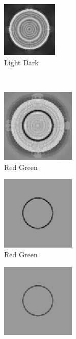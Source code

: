 \documentclass[journal,onecolumn]{IEEEtran}
\begin{document}
\begin{figure}[!htbp]
\begin{subfigure}[b]{0.25\textwidth}
    \end{subfigure}%
    \begin{subfigure}[b]{0.25\textwidth}
            \centering
            \includegraphics[width=100px, frame]{test-circle-neon-dwt-b-ld}
            \caption{Light Dark}
            \label{img:test-circle-neon-dwt-b-ld}
    \end{subfigure}\\
    \begin{subfigure}[b]{0.25\textwidth}
            \centering
            \includegraphics[width=100pt, frame]{test-circle-neon-dwt-a-rg}
            \caption{Red Green}
            \label{img:test-circle-neon-dwt-a-rg}
    \end{subfigure}%
    \begin{subfigure}[b]{0.25\textwidth}
            \centering
            \includegraphics[width=100pt, frame]{test-circle-neon-dwt-a-rg-mask}
            \caption{Red Green}
            \label{img:test-circle-neon-dwt-a-rg-mask}
    \end{subfigure}%
    \begin{subfigure}[b]{0.25\textwidth}
            \centering
            \includegraphics[width=100pt, frame]{test-circle-neon-dwt-b-rg-mask}

\end{subfigure}
\end{figure}
\end{document}
